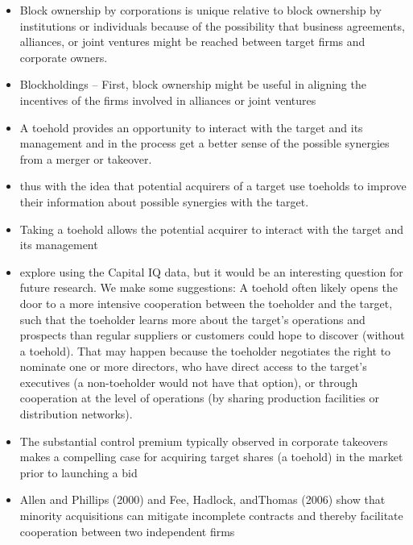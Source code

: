 \documentclass[12pt]{article}
\begin{document}
\begin{itemize}
    \item Block ownership by corporations is unique relative to block ownership by institutions or individuals because of the possibility that business agreements, alliances, or joint ventures might be reached between target firms and corporate owners. \citep{Allen2000}

    \item Blockholdings -- First, block ownership might be useful in aligning the incentives of the firms involved in alliances or joint ventures \citep{Allen2000}

    \item A toehold provides an opportunity to interact with the target and its management and in the process get a better sense of the possible synergies from a merger or takeover. \citep{Povel2014}

    \item thus with the idea that potential acquirers of a target use toeholds to improve their information about possible synergies with the target. \citep{Povel2014}

    \item Taking a toehold allows the potential acquirer to interact with the target and its management \citep{Povel2014}

    \item explore using the Capital IQ data, but it would be an interesting question for future research. We make some suggestions: A toehold often likely opens the door to a more intensive cooperation between the toeholder and the target, such that the toeholder learns more about the target's operations and prospects than regular suppliers or customers could hope to discover (without a toehold). That may happen because the toeholder negotiates the right to nominate one or more directors, who have direct access to the target's executives (a non-toeholder would not have that option), or through cooperation at the level of operations (by sharing production facilities or distribution networks). \citep{Povel2014}

    \item The substantial control premium typically observed in corporate takeovers makes a compelling case for acquiring target shares (a toehold) in the market prior to launching a bid \citep{Betton2009}

    \item Allen and Phillips (2000) and Fee, Hadlock, andThomas (2006) show that minority acquisitions can mitigate incomplete contracts and thereby facilitate cooperation between two independent firms \citep{Ouimet2013}


\end{itemize}
\end{document}
